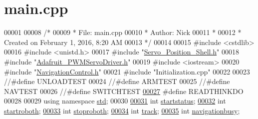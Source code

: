 \hypertarget{main_8cpp_source}{\section{main.\+cpp}
\label{main_8cpp_source}
}

\begin{DoxyCode}
00001 
00008 \textcolor{comment}{/* }
00009 \textcolor{comment}{ * File:   main.cpp}
00010 \textcolor{comment}{ * Author: Nick}
00011 \textcolor{comment}{ *}
00012 \textcolor{comment}{ * Created on February 1, 2016, 8:20 AM}
00013 \textcolor{comment}{ */}
00014 
00015 \textcolor{preprocessor}{#include <cstdlib>}
00016 \textcolor{preprocessor}{#include <unistd.h>}
00017 \textcolor{preprocessor}{#include "\hyperlink{Servo__Position__Shell_8h}{Servo\_Position\_Shell.h}"}
00018 \textcolor{preprocessor}{#include "\hyperlink{Adafruit__PWMServoDriver_8h}{Adafruit\_PWMServoDriver.h}"}
00019 \textcolor{preprocessor}{#include <iostream>}
00020 \textcolor{preprocessor}{#include "\hyperlink{NavigationControl_8h}{NavigationControl.h}"}
00021 \textcolor{preprocessor}{#include "Initialization.cpp"}
00022 
00023 \textcolor{comment}{//#define UNLOADTEST}
00024 \textcolor{comment}{//#define ARMTEST}
00025 \textcolor{comment}{//#define NAVTEST}
00026 \textcolor{comment}{//#define SWITCHTEST}
\hypertarget{main_8cpp_source_l00027}{}\hyperlink{main_8cpp_ae6bb55c67a61b71415a4915beb236539}{00027} \textcolor{preprocessor}{#define READTHINKDO}
00028 
00029 \textcolor{keyword}{using namespace }\hyperlink{namespacestd}{std};
00030 
\hypertarget{main_8cpp_source_l00031}{}\hyperlink{main_8cpp_a86ef28eff7b2064f6e9f34bb8371d523}{00031} \textcolor{keywordtype}{int} \hyperlink{main_8cpp_a86ef28eff7b2064f6e9f34bb8371d523}{startstatus};
\hypertarget{main_8cpp_source_l00032}{}\hyperlink{main_8cpp_ad9b6ac21900fa682d910b2c72a6d1a7f}{00032} \textcolor{keywordtype}{int} \hyperlink{main_8cpp_ad9b6ac21900fa682d910b2c72a6d1a7f}{startroboth};
\hypertarget{main_8cpp_source_l00033}{}\hyperlink{main_8cpp_ac941dfef463fc77cd96e79758d7d8a57}{00033} \textcolor{keywordtype}{int} \hyperlink{main_8cpp_ac941dfef463fc77cd96e79758d7d8a57}{stoproboth};
\hypertarget{main_8cpp_source_l00034}{}\hyperlink{main_8cpp_addcde177bac7b0d7c1250ce907df0b70}{00034} \textcolor{keywordtype}{int} \hyperlink{main_8cpp_addcde177bac7b0d7c1250ce907df0b70}{track};
\hypertarget{main_8cpp_source_l00035}{}\hyperlink{main_8cpp_ad384b7375208fa5ff0275908ffbfaeab}{00035} \textcolor{keywordtype}{int} \hyperlink{main_8cpp_ad384b7375208fa5ff0275908ffbfaeab}{navigationbusy};

\end{DoxyCode}
